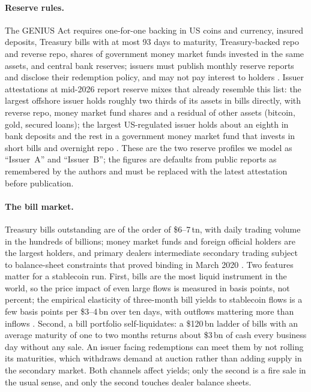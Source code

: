 \paragraph{Reserve rules.} The GENIUS Act requires one-for-one backing in US coins and currency, insured deposits,
Treasury bills with at most 93 days to maturity, Treasury-backed repo and reverse repo, shares of government money
market funds invested in the same assets, and central bank reserves; issuers must publish monthly reserve reports
and disclose their redemption policy, and may not pay interest to holders \citep{genius2025}. Issuer attestations at
mid-2026 report reserve mixes that already resemble this list: the largest offshore issuer holds roughly two thirds
of its assets in bills directly, with reverse repo, money market fund shares and a residual of other assets
(bitcoin, gold, secured loans); the largest US-regulated issuer holds about an eighth in bank deposits and the rest
in a government money market fund that invests in short bills and overnight repo \citep{tether_attest,circle_reserve}.
These are the two reserve profiles we model as ``Issuer~A'' and ``Issuer~B''; the figures are defaults from public
reports as remembered by the authors and must be replaced with the latest attestation before publication.

\paragraph{The bill market.} Treasury bills outstanding are of the order of \$6--7\,tn, with daily trading volume
in the hundreds of billions; money market funds and foreign official holders are the largest holders, and primary
dealers intermediate secondary trading subject to balance-sheet constraints that proved binding in March 2020
\citep{duffie2020,vissing2021,he2022}. Two features matter for a stablecoin run. First, bills are the most liquid
instrument in the world, so the price impact of even large flows is measured in basis points, not percent; the
empirical elasticity of three-month bill yields to stablecoin flows is a few basis points per \$3--4\,bn over ten
days, with outflows mattering more than inflows \citep{ahmed2025}. Second, a bill portfolio self-liquidates: a
\$120\,bn ladder of bills with an average maturity of one to two months returns about \$3\,bn of cash every
business day without any sale. An issuer facing redemptions can meet them by not rolling its maturities, which
withdraws demand at auction rather than adding supply in the secondary market. Both channels affect yields; only
the second is a fire sale in the usual sense, and only the second touches dealer balance sheets.

